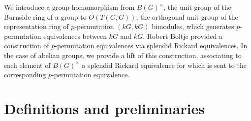 

\author{Sam Kim Miller}



\maketitle

We introduce a group homomorphism from $B(G)^\times$, the unit group of the Burnside ring of a group to $O(T(G,G))$, the orthogonal unit group of the representation ring of $p$-permutation $(kG,kG)$ bimodules, which generates $p$-permutation equivalences between $kG$ and $kG$. Robert Boltje provided a construction of $p$-permutation equivalences via splendid Rickard equivalences. In the case of abelian groups, we provide a lift of this construction, associating to each element of $B(G)^\times$ a splendid Rickard equivalence for which is sent to the corresponding $p$-permutation equivalence. 

\section{Definitions and preliminaries}

